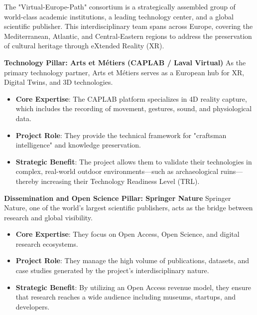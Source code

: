 \noindent
The "Virtual-Europe-Path" consortium is a strategically assembled group of world-class academic institutions, a leading technology center, and a global scientific publisher. This interdisciplinary team spans across Europe, covering the Mediterranean, Atlantic, and Central-Eastern regions to address the preservation of cultural heritage through eXtended Reality (XR).

\textbf{Technology Pillar: Arts et Métiers (CAPLAB / Laval Virtual)}
As the primary technology partner, Arts et Métiers serves as a European hub for XR, Digital Twins, and 3D technologies.
\begin{itemize}
    \item \textbf{Core Expertise}: The CAPLAB platform specializes in 4D reality capture, which includes the recording of movement, gestures, sound, and physiological data.
    \item \textbf{Project Role}: They provide the technical framework for "craftsman intelligence" and knowledge preservation.
    \item \textbf{Strategic Benefit}: The project allows them to validate their technologies in complex, real-world outdoor environments—such as archaeological ruins—thereby increasing their Technology Readiness Level (TRL).
\end{itemize}

\textbf{Dissemination and Open Science Pillar: Springer Nature}
Springer Nature, one of the world's largest scientific publishers, acts as the bridge between research and global visibility.
\begin{itemize}
    \item \textbf{Core Expertise}: They focus on Open Access, Open Science, and digital research ecosystems.
    \item \textbf{Project Role}: They manage the high volume of publications, datasets, and case studies generated by the project's interdisciplinary nature.
    \item \textbf{Strategic Benefit}: By utilizing an Open Access revenue model, they ensure that research reaches a wide audience including museums, startups, and developers.
\end{itemize}

